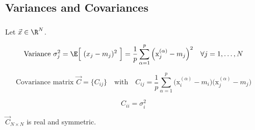 \subsection{Variances and Covariances}


\begin{frame}\frametitle{\subsecname}

Let $\vec x \in \R^N$.

\begin{equation}
\text{Variance}~\sigma_j^2 = \E\Big\lbrack~(x_j - m_j)^2~\Big\rbrack = \frac{1}{p} \sum\limits_{\alpha = 1}^p 
		 \Big( \mathrm{x}_j^{(\alpha)} - m_j \Big)^2 \quad \forall j=1,\ldots,N
\end{equation}

\pause

\begin{equation}
	\text{Covariance matrix } \vec{C} = \big\{ C_{ij} \big\} \quad \text{with} \quad
	C_{ij} = \frac{1}{p} \sum\limits_{\alpha = 1}^p 
		 \Big( \mathrm{x}_i^{(\alpha)} - m_i \Big) 
		 \Big( \mathrm{x}_j^{(\alpha)} - m_j \Big)
\end{equation}


\begin{equation}
C_{ii} = \sigma^2_i
\end{equation}

$\vec{C}_{N \times N}$ is real and symmetric.

		
\end{frame}


